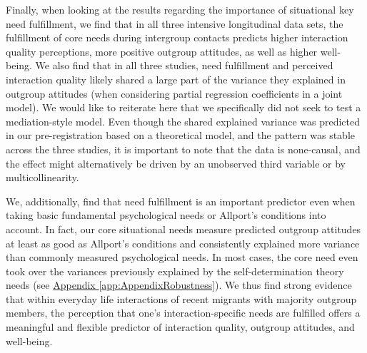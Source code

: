 \documentclass[man, 12pt, a4paper, mask]{apa7}
\theoremstyle{break}
\theoremstyle{plain}
\newcommand{\appref}[2][]{\hyperref[#2]{Appendix \ref*{#2}#1}}
\begin{document}
Finally, when looking at the results regarding the importance of situational key need fulfillment, we find that in all three intensive longitudinal data sets, the fulfillment of core needs during intergroup contacts predicts higher interaction quality perceptions, more positive outgroup attitudes, as well as higher well-being. We also find that in all three studies, need fulfillment and perceived interaction quality likely shared a large part of the variance they explained in outgroup attitudes (when considering partial regression coefficients in a joint model). We would like to reiterate here that we specifically did not seek to test a mediation-style model. Even though the shared explained variance was predicted in our pre-registration based on a theoretical model, and the pattern was stable across the three studies, it is important to note that the data is none-causal, and the effect might alternatively be driven by an unobserved third variable or by multicollinearity.

We, additionally, find that need fulfillment is an important predictor even when taking basic fundamental psychological needs or Allport's conditions into account. In fact, our core situational needs measure predicted outgroup attitudes at least as good as Allport's conditions and consistently explained more variance than commonly measured psychological needs. In most cases, the core need even took over the variances previously explained by the self-determination theory needs (see \appref{app:AppendixRobustness}). We thus find strong evidence that within everyday life interactions of recent migrants with majority outgroup members, the perception that one's interaction-specific needs are fulfilled offers a meaningful and flexible predictor of interaction quality, outgroup attitudes, and well-being.
\end{document}
